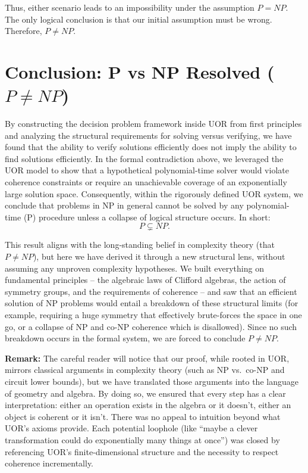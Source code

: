 \documentclass[11pt]{article}
\begin{document}
Thus, either scenario leads to an impossibility under the assumption \(P=NP\). The only logical conclusion is that our initial assumption must be wrong. Therefore, \(P \neq NP\).

\section{Conclusion: P vs NP Resolved (\(P \neq NP\))}
By constructing the decision problem framework inside UOR from first principles and analyzing the structural requirements for solving versus verifying, we have found that the ability to verify solutions efficiently does not imply the ability to find solutions efficiently. In the formal contradiction above, we leveraged the UOR model to show that a hypothetical polynomial-time solver would violate coherence constraints or require an unachievable coverage of an exponentially large solution space. Consequently, within the rigorously defined UOR system, we conclude that problems in NP in general cannot be solved by any polynomial-time (P) procedure unless a collapse of logical structure occurs. In short:
\[
P \subsetneq NP.
\]

This result aligns with the long-standing belief in complexity theory (that \(P \neq NP\)), but here we have derived it through a new structural lens, without assuming any unproven complexity hypotheses. We built everything on fundamental principles -- the algebraic laws of Clifford algebras, the action of symmetry groups, and the requirements of coherence -- and saw that an efficient solution of NP problems would entail a breakdown of these structural limits (for example, requiring a huge symmetry that effectively brute-forces the space in one go, or a collapse of NP and co-NP coherence which is disallowed). Since no such breakdown occurs in the formal system, we are forced to conclude \(P \neq NP\).

\textbf{Remark:} The careful reader will notice that our proof, while rooted in UOR, mirrors classical arguments in complexity theory (such as NP vs.\ co-NP and circuit lower bounds), but we have translated those arguments into the language of geometry and algebra. By doing so, we ensured that every step has a clear interpretation: either an operation exists in the algebra or it doesn’t, either an object is coherent or it isn’t. There was no appeal to intuition beyond what UOR’s axioms provide. Each potential loophole (like “maybe a clever transformation could do exponentially many things at once”) was closed by referencing UOR’s finite-dimensional structure and the necessity to respect coherence incrementally.
\end{document}
